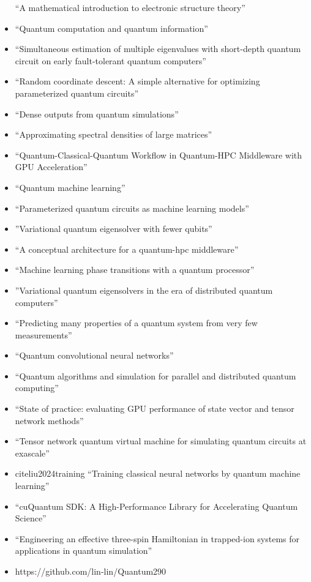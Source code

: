 \documentclass[]{article}
\begin{document}
\begin{itemize}
``A mathematical introduction to electronic structure theory''
\item \cite{nielsen2010quantum}
``Quantum computation and quantum information''
\item \cite{ding2023simultaneous}
``Simultaneous estimation of multiple eigenvalues with short-depth quantum circuit on early fault-tolerant quantum computers''
\item \cite{ding2024random}
  ``Random coordinate descent: A simple alternative for optimizing parameterized quantum circuits''
\item \cite{LIU2024113213}
``Dense outputs from quantum simulations''
\item \cite{lin2016approximating}
``Approximating spectral densities of large matrices''
\item \cite{10628380}
``Quantum-Classical-Quantum Workflow in Quantum-HPC Middleware with GPU Acceleration''
\item \cite{biamonte2017quantum}
``Quantum machine learning''
\item \cite{Benedetti_2019}
``Parameterized quantum circuits as machine learning models''
\item \cite{PhysRevResearch.1.023025}
''Variational quantum eigensolver with fewer qubits''
\item \cite{saurabh2023conceptual}
``A conceptual architecture for a quantum-hpc middleware''
\item \cite{uvarov2020machine}
``Machine learning phase transitions with a quantum processor''
\item \cite{khait2023variational}
''Variational quantum eigensolvers in the era of distributed quantum computers''
\item \cite{huang2020predicting}
``Predicting many properties of a quantum system from very few measurements''
\item \cite{cong2019quantum}
``Quantum convolutional neural networks''
\item \cite{parekh2021quantum}
``Quantum algorithms and simulation for parallel and distributed quantum computing''
\item \cite{vallero2024state}
``State of practice: evaluating GPU performance of state vector and tensor network methods''
\item \cite{nguyen2022tensor}
``Tensor network quantum virtual machine for simulating quantum circuits at exascale''
\item cite{liu2024training}
``Training classical neural networks by quantum machine learning''
\item \cite{10313722}
``cuQuantum SDK: A High-Performance Library for Accelerating Quantum Science''
\item \cite{Andrade_2022}
``Engineering an effective three-spin Hamiltonian in trapped-ion systems for applications in quantum simulation''
\item https://github.com/lin-lin/Quantum290
\end{itemize}
\end{document}
